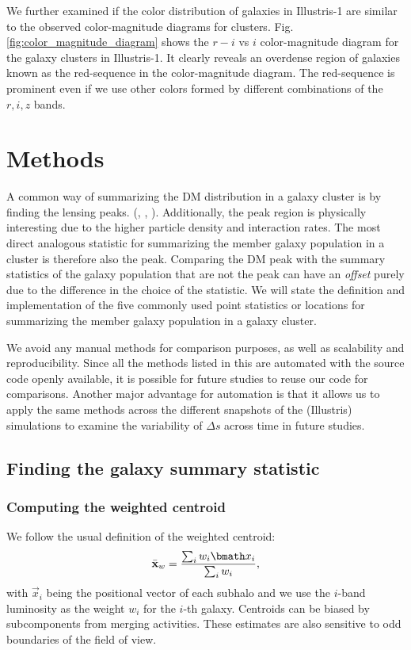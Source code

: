 We further examined if the color distribution of galaxies in Illustris-1 are
similar to the observed color-magnitude diagrams for clusters.
Fig. \ref{fig:color_magnitude_diagram} shows the $r-i$ vs $i$ color-magnitude
diagram for the galaxy clusters in Illustris-1.
It clearly reveals an overdense region of galaxies known as the red-sequence in the 
color-magnitude diagram. The red-sequence is prominent even if we
use other colors formed by different combinations of the $r, i, z$ bands.

\section{Methods}\label{sec:methods}
A common way of summarizing the DM distribution in a
galaxy cluster is by finding the lensing peaks.
(\citealt{Medezinski2013}, \citealt{Markevitch2004}, 
\citealt{Zitrin13}). 
Additionally, the peak region is physically 
interesting due to the higher particle density and interaction rates. 
The most direct analogous statistic for summarizing the member galaxy
population in a cluster is therefore also the peak. 
Comparing the DM peak with the summary statistics of the galaxy population that
are not the peak  can have an {\it offset} purely due to the difference in
the choice of the statistic. 
We will state the definition and implementation of the five commonly used 
point statistics or locations for summarizing 
the member galaxy population in a galaxy cluster.

We avoid any manual methods for
comparison purposes, as well as scalability and reproducibility. 
Since all the methods listed in this 
are automated with the source code openly available, 
it is possible for future studies to reuse our code for comparisons. 
Another major advantage for automation is that it allows us  
to apply
the same methods across the different snapshots of the (Illustris) simulations to
examine the variability of $\Delta s$ across time in future studies. 


\subsection{Finding the galaxy summary statistic}
\subsubsection{Computing the weighted centroid}
\label{subsubsec:weighted_centroid}
We follow the usual definition of the weighted centroid: 
\begin{equation}
	\bar{\bf x}_w = \frac{\sum_i w_i \vec{x}_i}{\sum_i w_i},
\end{equation}
with $\vec{x}_i$ being the positional vector of each subhalo 
and we use the $i$-band luminosity 
as the weight $w_i$ for the $i$-th galaxy.
Centroids can be biased by subcomponents from merging activities. 
These estimates are also sensitive to odd boundaries 
of the field of view.

